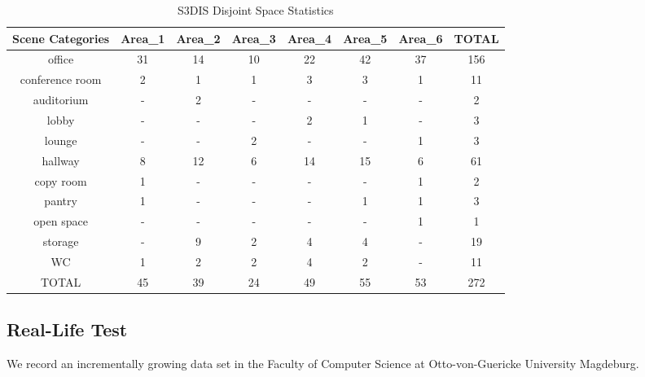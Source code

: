 \documentclass[main.tex]{subfiles}
\begin{document}
\begin{table}[!ht]
    \centering
    \begin{tabular}{c|c|c|c|c|c|c|c}
        \hline
        Scene Categories & Area\_1 & Area\_2 & Area\_3 & Area\_4 & Area\_5 & Area\_6 & TOTAL \\ \hline
        office           & 31      & 14      & 10      & 22      & 42      & 37      & 156   \\ \hline
        conference room  & 2       & 1       & 1       & 3       & 3       & 1       & 11    \\ \hline
        auditorium       & -       & 2       & -       & -       & -       & -       & 2     \\ \hline
        lobby            & -       & -       & -       & 2       & 1       & -       & 3     \\ \hline
        lounge           & -       & -       & 2       & -       & -       & 1       & 3     \\ \hline
        hallway          & 8       & 12      & 6       & 14      & 15      & 6       & 61    \\ \hline
        copy room        & 1       & -       & -       & -       & -       & 1       & 2     \\ \hline
        pantry           & 1       & -       & -       & -       & 1       & 1       & 3     \\ \hline
        open space       & -       & -       & -       & -       & -       & 1       & 1     \\ \hline
        storage          & -       & 9       & 2       & 4       & 4       & -       & 19    \\ \hline
        WC               & 1       & 2       & 2       & 4       & 2       & -       & 11    \\ \hline
        TOTAL            & 45      & 39      & 24      & 49      & 55      & 53      & 272   \\
    \end{tabular}
    \caption{S3DIS Disjoint Space Statistics}
    \label{tab:stanfordStats}
\end{table}

\subsection{Real-Life Test}
We record an incrementally growing data set in the Faculty of Computer Science at Otto-von-Guericke University Magdeburg.
\end{document}
